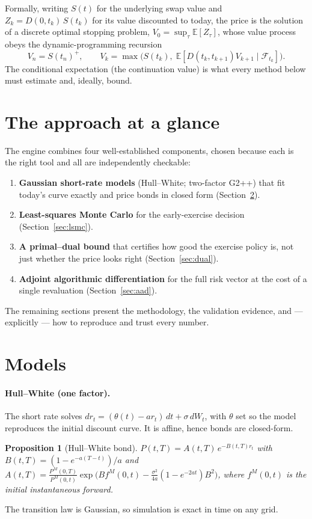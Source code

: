 \documentclass[11pt]{article}
\theoremstyle{plain}
\newtheorem{proposition}{Proposition}
\theoremstyle{definition}
\newcommand{\E}{\mathbb{E}}
\newcommand{\F}{\mathcal{F}}
\begin{document}
Formally, writing $S(t)$ for the underlying swap value and $Z_k=D(0,t_k)\,S(t_k)$ for its value
discounted to today, the price is the solution of a discrete optimal stopping problem,
$V_0=\sup_{\tau}\E[Z_\tau]$, whose value process obeys the dynamic-programming recursion
\[
V_n=S(t_n)^+,\qquad V_k=\max\!\big(S(t_k),\;\E[D(t_k,t_{k+1})V_{k+1}\mid\F_{t_k}]\big).
\]
The conditional expectation (the continuation value) is what every method below must estimate
and, ideally, bound.

\section{The approach at a glance}
The engine combines four well-established components, chosen because each is the right tool and
all are independently checkable:
\begin{enumerate}[nosep,leftmargin=1.4em]
  \item \textbf{Gaussian short-rate models} (Hull--White; two-factor G2++) that fit today's curve
        exactly and price bonds in closed form (Section~\ref{sec:models}).
  \item \textbf{Least-squares Monte Carlo} for the early-exercise decision (Section~\ref{sec:lsmc}).
  \item \textbf{A primal--dual bound} that certifies how good the exercise policy is, not just
        whether the price looks right (Section~\ref{sec:dual}).
  \item \textbf{Adjoint algorithmic differentiation} for the full risk vector at the cost of a
        single revaluation (Section~\ref{sec:aad}).
\end{enumerate}
The remaining sections present the methodology, the validation evidence, and --- explicitly ---
how to reproduce and trust every number.

\section{Models}
\label{sec:models}
\paragraph{Hull--White (one factor).} The short rate solves $dr_t=(\theta(t)-a r_t)\,dt+\sigma\,dW_t$,
with $\theta$ set so the model reproduces the initial discount curve. It is affine, hence bonds
are closed-form.
\begin{proposition}[Hull--White bond]
\label{prop:hw}
$P(t,T)=A(t,T)\,e^{-B(t,T)r_t}$ with $B(t,T)=(1-e^{-a(T-t)})/a$ and
$A(t,T)=\frac{P^M(0,T)}{P^M(0,t)}\exp\!\big(B f^M(0,t)-\tfrac{\sigma^2}{4a}(1-e^{-2at})B^2\big)$,
where $f^M(0,t)$ is the initial instantaneous forward.
\end{proposition}
The transition law is Gaussian, so simulation is exact in time on any grid.
\end{document}
